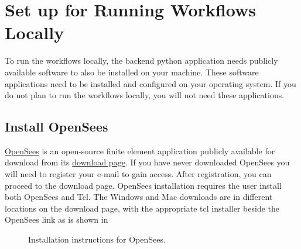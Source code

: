 \section{Set up for Running Workflows Locally}\label{setup}

To run the workflows locally, the backend python application needs
publicly available software to also be installed on your
machine. These software applications need to be installed and
configured on your operating system. If you do not plan to run the
workflows locally, you will not need these applications.

\subsection{Install OpenSees}

\href{https://opensees.berkeley.edu}{OpenSees} is an open-source finite element application publicly available for download from its \href{https://opensees.berkeley.edu/OpenSees/user/download.php}{download page}. If you have never downloaded OpenSees you will need to register your e-mail to gain access. After registration, you can proceed to the download page. OpenSees installation requires the user install both OpenSees and Tcl. The Windows and Mac downloads are in different locations on the download page, with the appropriate tcl installer beside the OpenSees link as is shown in 

\begin{figure}[!htbp]
   \caption{Installation
    instructions for OpenSees.}  \label{fig:opensees_installation}
\end{figure}

